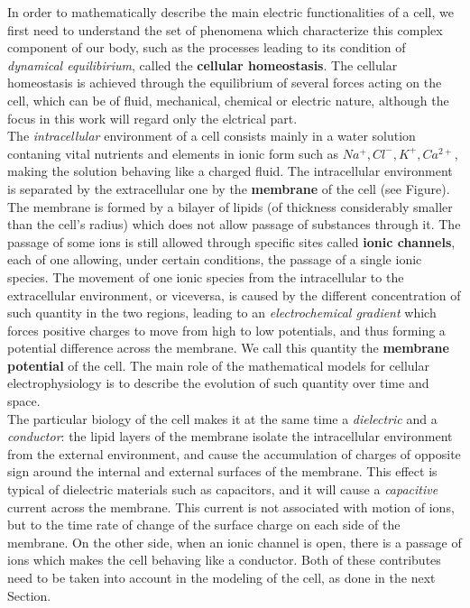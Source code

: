 \documentclass[a4paper]{article}
\begin{document}
In order to mathematically describe the main electric functionalities of a cell, we first need to understand the set of phenomena which characterize this complex component of our body, such as the processes leading to its condition of \textit{dynamical equilibirium}, called the \textbf{cellular homeostasis}. The cellular homeostasis is achieved through the equilibrium of several forces acting on the cell, which can be of fluid, mechanical, chemical or electric nature, although the focus in this work will regard only the elctrical part.\\
The \textit{intracellular} environment of a cell consists mainly in a water solution contaning vital nutrients and elements in ionic form such as  $Na^+, Cl^-, K^+, Ca^{2+}$, making the solution behaving like a charged fluid. The intracellular environment is separated by the extracellular one by the \textbf{membrane} of the cell (see Figure). The membrane is formed by a bilayer of lipids (of thickness considerably smaller than the cell's radius) which does not allow passage of substances through it. The passage of some ions is still allowed through specific sites called \textbf{ionic channels}, each of one allowing, under certain conditions, the passage of a single ionic species. The movement of one ionic species from the intracellular to the extracellular environment, or viceversa, is caused by the different concentration of such quantity in the two regions, leading to an \textit{electrochemical gradient} which forces positive charges to move from high to low potentials, and thus forming a potential difference across the membrane. We call this quantity the \textbf{membrane potential} of the cell. The main role of the mathematical models for cellular electrophysiology is to describe the evolution of such quantity over time and space.
\\

The particular biology of the cell makes it at the same time a \textit{dielectric} and a \textit{conductor}: the lipid layers of the membrane isolate the intracellular environment from the external environment, and cause the accumulation of charges of opposite sign around the internal and external surfaces of the membrane. This effect is typical of dielectric materials such as capacitors, and it will cause a \textit{capacitive} current across the membrane. This current is not associated with motion of ions, but to the time rate of change of the surface charge on each side of the membrane. On the other side, when an ionic channel is open, there is a passage of ions which makes the cell behaving like a conductor. Both of these contributes need to be taken into account in the modeling of the cell, as done in the next Section.
\\
\end{document}
